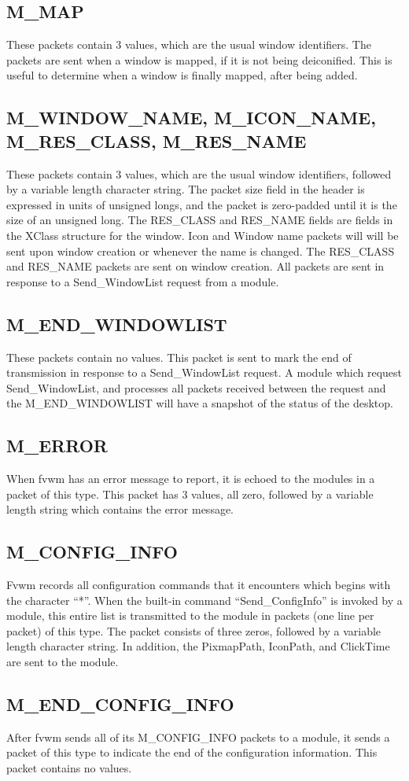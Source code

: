 \subsection{M\_MAP}
These packets contain 3 values, which are the usual window
identifiers. The packets are sent when a window is mapped, if it is
not being deiconified. This is useful to determine when a window is
finally mapped, after being added.

\subsection{M\_WINDOW\_NAME, M\_ICON\_NAME, M\_RES\_CLASS, M\_RES\_NAME}
These packets contain 3 values, which are the usual window
identifiers, followed by a variable length character string. The
packet size field in the header is expressed in units of unsigned
longs, and the packet is zero-padded until it is the  size of an
unsigned long. The RES\_CLASS and RES\_NAME fields are fields in the
XClass structure for the window. Icon and Window name packets will
will be sent upon window creation or whenever the name is changed. The
RES\_CLASS and RES\_NAME packets are sent on window creation. All
packets are sent in response to a Send\_WindowList request from a module.

\subsection{M\_END\_WINDOWLIST}
These packets contain no values. This packet is sent to mark the end
of transmission in response to  a Send\_WindowList request. A module
which request Send\_WindowList, and processes all packets received
between the request and the M\_END\_WINDOWLIST will have a snapshot of
the status of the desktop.

\subsection{M\_ERROR}
When fvwm has an error message to report, it is echoed to the modules
in a packet of this type. This packet has 3 values, all zero, followed
by a variable length string which contains the error message.

\subsection{M\_CONFIG\_INFO}
Fvwm records all configuration commands that it encounters which
begins with the character ``*''. When the built-in command
``Send\_ConfigInfo'' is invoked by a module, this entire list is
transmitted to the module in packets (one line per packet) of this
type. The packet consists of three zeros, followed by a variable
length character string. In addition, the PixmapPath, IconPath, and
ClickTime  are sent to the module.

\subsection{M\_END\_CONFIG\_INFO}
After fvwm sends all of its M\_CONFIG\_INFO packets to a module, it
sends a packet of this type to indicate the end of the configuration
information. This packet contains no values.





